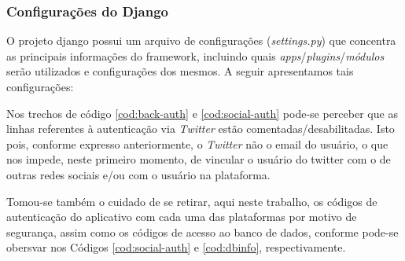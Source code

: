 \subsubsection{Configurações do Django}
O projeto django possui um arquivo de configurações (\textit{settings.py}) que concentra as principais informações do framework, incluindo quais \textit{apps}/\textit{plugins}/\textit{módulos} serão utilizados e configurações dos mesmos.
A seguir apresentamos tais configurações:






\clearpage




Nos trechos de código \ref{cod:back-auth} e \ref{cod:social-auth} pode-se perceber que as linhas referentes à autenticação via \textit{Twitter} estão comentadas/desabilitadas. Isto pois, conforme expresso anteriormente, o \textit{Twitter} não o email do usuário, o que nos impede, neste primeiro momento, de vincular o usuário do twitter com o de outras redes sociais e/ou com o usuário na plataforma.

Tomou-se também o cuidado de se retirar, aqui neste trabalho, os códigos de autenticação do aplicativo com cada uma das plataformas por motivo de segurança, assim como os códigos de acesso ao banco de dados, conforme pode-se obersvar nos Códigos \ref{cod:social-auth} e \ref{cod:dbinfo}, respectivamente.

